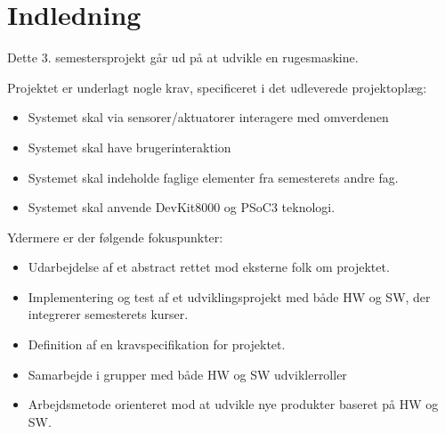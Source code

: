 \chapter{Indledning}

Dette 3. semestersprojekt går ud på at udvikle en rugesmaskine.


Projektet er underlagt nogle krav, specificeret i det udleverede projektoplæg:

\begin{itemize}
\item Systemet skal via sensorer/aktuatorer interagere med omverdenen
\item Systemet skal have brugerinteraktion
\item Systemet skal indeholde faglige elementer fra semesterets andre fag.
\item Systemet skal anvende DevKit8000 og PSoC3 teknologi.
\end{itemize}

Ydermere er der følgende fokuspunkter:
\begin{itemize}
\item Udarbejdelse af et abstract rettet mod eksterne folk om projektet.
\item Implementering og test af et udviklingsprojekt med både HW og SW, der integrerer semesterets
kurser.
\item Definition af en kravspecifikation for projektet.
\item Samarbejde i grupper med både HW og SW udviklerroller
\item Arbejdsmetode orienteret mod at udvikle nye produkter baseret på HW og SW.
\end{itemize}









\clearpage